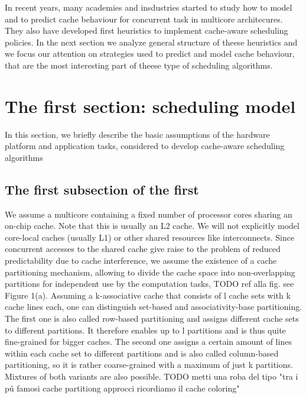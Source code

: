 \documentclass[a4paper,10pt]{article}
\begin{document}
\begin{multicols}{2}
In recent years, many academies and insdustries started to study how to model and to predict cache behaviour for concurrent task in multicore architecures.
They also have developed first heuristics to implement cache-aware scheduling policies.
In the next section we analyze general structure of theese heuristics and we focus our attention on strategies used to predict and model cache behaviour,
that are the most interesting part of theese type of scheduling algorithms.


\section{The first section: scheduling model}

In this section, we briefly describe the basic assumptions of the hardware platform and application tasks, considered to develop cache-aware 
scheduling algorithms

\subsection{The first subsection of the first}

We assume a multicore containing a fixed number of processor cores sharing an on-chip cache. Note that this is usually an L2 cache. We 
will not explicitly model core-local caches (usually L1) or other shared resources like interconnects. Since concurrent accesses to the shared 
cache give raise to the problem of reduced predictability due to cache interference, we assume the existence of a cache partitioning 
mechanism, allowing to divide the cache space into non-overlapping partitions for independent use by the computation tasks, TODO ref alla fig.
see Figure 1(a).
Assuming a k-associative cache that consists of l cache sets with k cache lines each, one can distinguish set-based and associativity-base
partitioning. The first one is also called row-based partitioning and assigns different cache sets to different partitions. It therefore enables
up to l partitions and is thus quite fine-grained for bigger caches. The second one assigns a certain amount of lines within each cache set 
to different partitions and is also called column-based partitioning, so it is rather coarse-grained with a maximum of just k partitions. 
Mixtures of both variants are also possible. TODO metti una roba del tipo "tra i p\'u famosi cache partitiong approcci ricordiamo il cache coloring"


\end{multicols}
\end{document}
